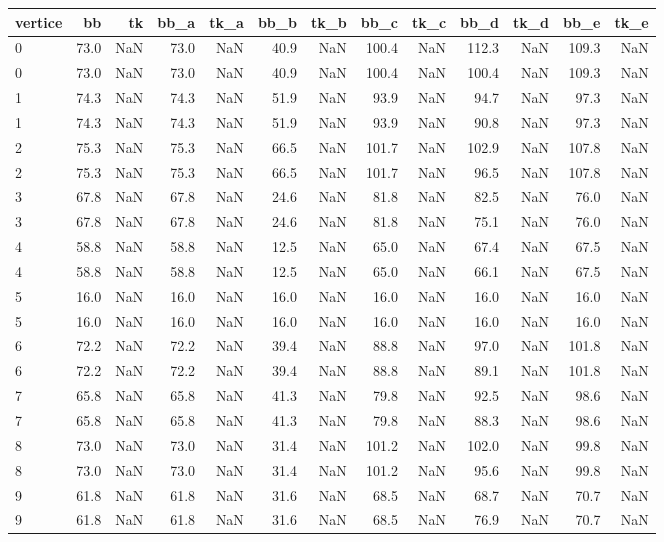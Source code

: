 \begin{tabular}{lrrrrrrrrrrrr}
\toprule
vertice & bb & tk & bb_a & tk_a & bb_b & tk_b & bb_c & tk_c & bb_d & tk_d & bb_e & tk_e \\
\midrule
0 & 73.0 & NaN & 73.0 & NaN & 40.9 & NaN & 100.4 & NaN & 112.3 & NaN & 109.3 & NaN \\
0 & 73.0 & NaN & 73.0 & NaN & 40.9 & NaN & 100.4 & NaN & 100.4 & NaN & 109.3 & NaN \\
1 & 74.3 & NaN & 74.3 & NaN & 51.9 & NaN & 93.9 & NaN & 94.7 & NaN & 97.3 & NaN \\
1 & 74.3 & NaN & 74.3 & NaN & 51.9 & NaN & 93.9 & NaN & 90.8 & NaN & 97.3 & NaN \\
2 & 75.3 & NaN & 75.3 & NaN & 66.5 & NaN & 101.7 & NaN & 102.9 & NaN & 107.8 & NaN \\
2 & 75.3 & NaN & 75.3 & NaN & 66.5 & NaN & 101.7 & NaN & 96.5 & NaN & 107.8 & NaN \\
3 & 67.8 & NaN & 67.8 & NaN & 24.6 & NaN & 81.8 & NaN & 82.5 & NaN & 76.0 & NaN \\
3 & 67.8 & NaN & 67.8 & NaN & 24.6 & NaN & 81.8 & NaN & 75.1 & NaN & 76.0 & NaN \\
4 & 58.8 & NaN & 58.8 & NaN & 12.5 & NaN & 65.0 & NaN & 67.4 & NaN & 67.5 & NaN \\
4 & 58.8 & NaN & 58.8 & NaN & 12.5 & NaN & 65.0 & NaN & 66.1 & NaN & 67.5 & NaN \\
5 & 16.0 & NaN & 16.0 & NaN & 16.0 & NaN & 16.0 & NaN & 16.0 & NaN & 16.0 & NaN \\
5 & 16.0 & NaN & 16.0 & NaN & 16.0 & NaN & 16.0 & NaN & 16.0 & NaN & 16.0 & NaN \\
6 & 72.2 & NaN & 72.2 & NaN & 39.4 & NaN & 88.8 & NaN & 97.0 & NaN & 101.8 & NaN \\
6 & 72.2 & NaN & 72.2 & NaN & 39.4 & NaN & 88.8 & NaN & 89.1 & NaN & 101.8 & NaN \\
7 & 65.8 & NaN & 65.8 & NaN & 41.3 & NaN & 79.8 & NaN & 92.5 & NaN & 98.6 & NaN \\
7 & 65.8 & NaN & 65.8 & NaN & 41.3 & NaN & 79.8 & NaN & 88.3 & NaN & 98.6 & NaN \\
8 & 73.0 & NaN & 73.0 & NaN & 31.4 & NaN & 101.2 & NaN & 102.0 & NaN & 99.8 & NaN \\
8 & 73.0 & NaN & 73.0 & NaN & 31.4 & NaN & 101.2 & NaN & 95.6 & NaN & 99.8 & NaN \\
9 & 61.8 & NaN & 61.8 & NaN & 31.6 & NaN & 68.5 & NaN & 68.7 & NaN & 70.7 & NaN \\
9 & 61.8 & NaN & 61.8 & NaN & 31.6 & NaN & 68.5 & NaN & 76.9 & NaN & 70.7 & NaN \\

\end{tabular}
